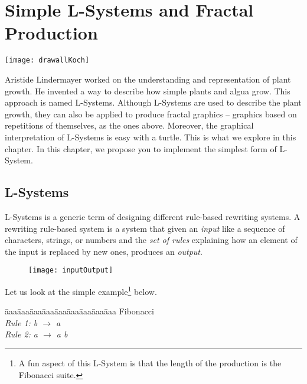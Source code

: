 \ifx\wholebook\relax\else



\fi

\project
\chapter{Simple L-Systems and Fractal Production}\label{ch:lsystem}

\begin{chapterfigure}
\texttt{[image: drawallKoch]}
\end{chapterfigure}


Aristide Lindermayer worked on the understanding and representation of
plant growth. He invented a way to describe how simple plants and algua grow. 
This approach is named L-Systems. Although L-Systems are used 
to describe the plant growth, they can also be applied to produce fractal
graphics \--- graphics based on repetitions of themselves, as the ones above.  Moreover, the graphical interpretation of L-Systems is easy with a turtle. This is
what we explore in this chapter. In this chapter, we propose you to implement 
the simplest form of L-System.


\section{L-Systems}\label{sec:lsystem}
L-Systems is a generic term of designing different rule-based
rewriting systems. A rewriting rule-based system is a system that
given an \emph{input} like a sequence of characters, strings, or
numbers and the \emph{set of rules} explaining how an element of the
input is replaced by new ones, produces an \emph{output}. 

\begin{figure}
\begin{center}
\texttt{[image: inputOutput]}
\label{An L-System is composed of: a set of rules. It takes an input and produces an output in which the rules have been applied on the input.}
\end{center}
\end{figure}

Let us look at the simple example\footnote{A fun aspect of this L-System
is that the length of the production is the Fibonacci suite.} below. 

\begin{tabbing}
\=aaa\=aaa\=aaa\=aaa\=aaa\=aaa\=aaa\=aaa\=aaa\kill
Fibonacci \\
\>\>\emph{Rule 1: b $\rightarrow$ a}\\
\>\>\emph{Rule 2: a $\rightarrow$ a b}
\end{tabbing}

